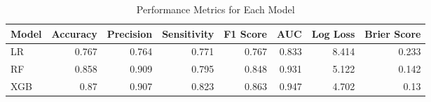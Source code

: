 \begin{table}[H]\centering
\caption{Performance Metrics for Each Model}
\label{Table 3 :performance_metrics}
\begin{tabular}{lrrrrrrr}
\toprule
Model & Accuracy & Precision & Sensitivity & F1 Score & AUC & Log Loss & Brier Score \\
\midrule
LR & 0.767 & 0.764 & 0.771 & 0.767 & 0.833 & 8.414 & 0.233 \\
RF & 0.858 & 0.909 & 0.795 & 0.848 & 0.931 & 5.122 & 0.142 \\
XGB & 0.87 & 0.907 & 0.823 & 0.863 & 0.947 & 4.702 & 0.13 \\
\bottomrule
\end{tabular}
\end{table}
